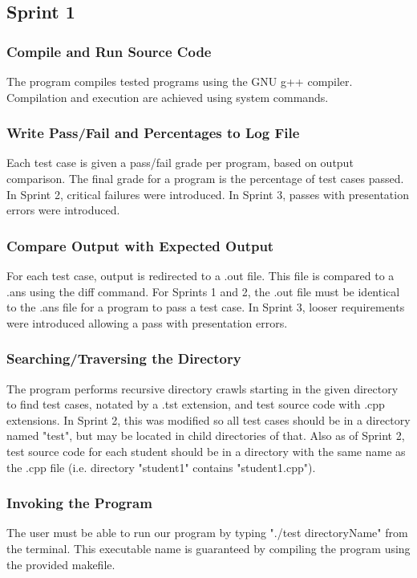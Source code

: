 \subsection{Sprint 1}

\subsubsection{Compile and Run Source Code}
The program compiles tested programs using the GNU g++ compiler. Compilation and execution are achieved using system commands.

\subsubsection{Write Pass/Fail and Percentages to Log File} 
Each test case is given a pass/fail grade per program, based on output comparison. The final grade for a program is the percentage of test cases passed. In Sprint 2, critical failures were introduced. In Sprint 3, passes with presentation errors were introduced.

\subsubsection{Compare Output with Expected Output}
For each test case, output is redirected to a .out file. This file is compared to a .ans using the diff command. For Sprints 1 and 2, the .out file must be identical to the .ans file for a program to pass a test case. In Sprint 3, looser requirements were introduced allowing a pass with presentation errors.

\subsubsection{Searching/Traversing the Directory}
The program performs recursive directory crawls starting in the given directory to find test cases, notated by a .tst extension, and test source code with .cpp extensions. In Sprint 2, this was modified so all test cases should be in a directory named "test", but may be located in child directories of that. Also as of Sprint 2, test source code for each student should be in a directory with the same name as the .cpp file (i.e. directory "student1" contains "student1.cpp").

\subsubsection{Invoking the Program}
The user must be able to run our program by typing "./test directoryName" from the terminal. This executable name is guaranteed by compiling the program using the provided makefile.

